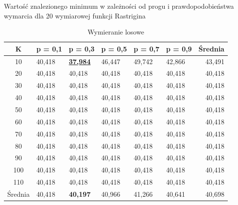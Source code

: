 \documentclass[10pt]{article}
\begin{document}
\begin{table}[H]
\caption{Wartość znalezionego minimum w zależności od progu i prawdopodobieństwa wymarcia dla 20 wymiarowej funkcji Rastrigina}
\label{tab:test-extinction-rastrigin}
\begin{subtable}{\textwidth}
\centering
\begin{tabularx}{0.8\textwidth}{c||X|X|X|X|X||r}
\hline
K & p = 0,1 & p = 0,3 & p = 0,5 & p = 0,7 & p = 0,9 & Średnia  \\ 
\hline \hline
10 & 40,418 & \underline{\textbf{37,984}} & 46,447 & 49,742 & 42,866 & 43,491  \\ 
20 & 40,418 & 40,418 & 40,418 & 40,418 & 40,418 & 40,418  \\ 
30 & 40,418 & 40,418 & 40,418 & 40,418 & 40,418 & 40,418  \\ 
40 & 40,418 & 40,418 & 40,418 & 40,418 & 40,418 & 40,418  \\ 
50 & 40,418 & 40,418 & 40,418 & 40,418 & 40,418 & 40,418  \\ 
60 & 40,418 & 40,418 & 40,418 & 40,418 & 40,418 & 40,418  \\ 
70 & 40,418 & 40,418 & 40,418 & 40,418 & 40,418 & 40,418  \\ 
80 & 40,418 & 40,418 & 40,418 & 40,418 & 40,418 & 40,418  \\ 
90 & 40,418 & 40,418 & 40,418 & 40,418 & 40,418 & 40,418  \\ 
100 & 40,418 & 40,418 & 40,418 & 40,418 & 40,418 & 40,418  \\ 
110 & 40,418 & 40,418 & 40,418 & 40,418 & 40,418 & 40,418  \\ 
\hline
Średnia & 40,418 & \textbf{40,197} & 40,966 & 41,266 & 40,641 & 40,698  \\ 
\hline
\end{tabularx}
\caption{Wymieranie losowe}
\end{subtable}


\end{table}
\end{document}
